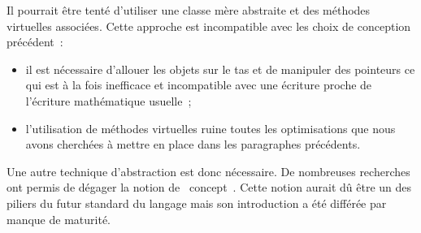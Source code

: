 \documentclass[rectoverso,pleiades,pstricks,leqno,anti]{texmf/note_technique_2010}
\def\ifmonospace{\ifdim\fontdimen3\font=0pt }
\def\cpp{%
\ifmonospace%
    C++%
\else%
    C\kern-.1667em\raise.30ex\hbox{\smaller{++}}%
\fi%
\spacefactor1000 }
\begin{document}
Il pourrait être tenté d'utiliser une classe mère abstraite et des
méthodes virtuelles associées. Cette approche est incompatible avec
les choix de conception précédent~:
\begin{itemize}
\item il est nécessaire d'allouer les objets sur le tas et de
  manipuler des pointeurs ce qui est à la fois inefficace et
  incompatible avec une écriture proche de l'écriture mathématique
  usuelle~;
\item l'utilisation de méthodes virtuelles ruine toutes les
  optimisations que nous avons cherchées à mettre en place dans les
  paragraphes précédents.
\end{itemize}

Une autre technique d'abstraction est donc nécessaire. De nombreuses
recherches ont permis de dégager la notion de \og~concept~\fg{}. Cette
notion aurait dû être un des piliers du futur standard du langage
\cpp{} mais son introduction a été différée par manque de maturité.
\end{document}
